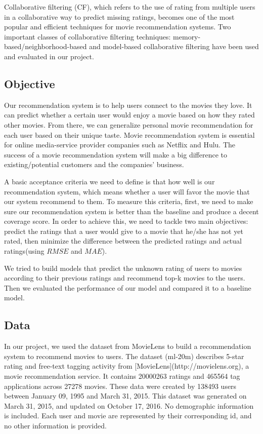 \documentclass[12pt,journal,compsoc]{IEEEtran}
\begin{document}
Collaborative filtering (CF), which refers to the use of rating from multiple users in a collaborative way to predict missing ratings, becomes one of the most popular and efficient techniques for movie recommendation systems. Two important classes of collaborative filtering techniques: memory-based/neighborhood-based and model-based collaborative filtering have been used and evaluated in our project. 

\subsection{Objective}

Our recommendation system is to help users connect to the movies they love. It can predict whether a certain user would enjoy a movie based on how they rated other movies. From there, we can generalize personal movie recommendation for each user based on their unique taste. Movie recommendation system is essential for online media-service provider companies such as Netflix and Hulu. The success of a movie recommendation system will make a big difference to existing/potential customers and the companies' business. 

A basic acceptance criteria we need to define is that how well is our recommendation system, which means whether a user will favor the movie that our system recommend to them. To measure this criteria, first, we need to make sure our recommendation system is better than the baseline and produce a decent coverage score. In order to achieve this, we need to tackle two main objectives: predict the ratings that a user would give to a movie that he/she has not yet rated, then minimize the difference between the predicted ratings and actual ratings(using $RMSE$ and $MAE$).

We tried to build models that predict the unknown rating of users to movies according to their previous ratings and recommend top-k movies to the users. Then we evaluated the performance of our model and compared it to a baseline model.

\subsection{Data}

In our project, we used the dataset from MovieLens to build a recommendation system to recommend movies to users. The dataset (ml-20m) describes 5-star rating and free-text tagging activity from [MovieLens](http://movielens.org), a movie recommendation service. It contains 20000263 ratings and 465564 tag applications across 27278 movies. These data were created by 138493 users between January 09, 1995 and March 31, 2015. This dataset was generated on March 31, 2015, and updated on October 17, 2016. No demographic information is included. Each user and movie are represented by their corresponding id, and no other information is provided.
\end{document}
